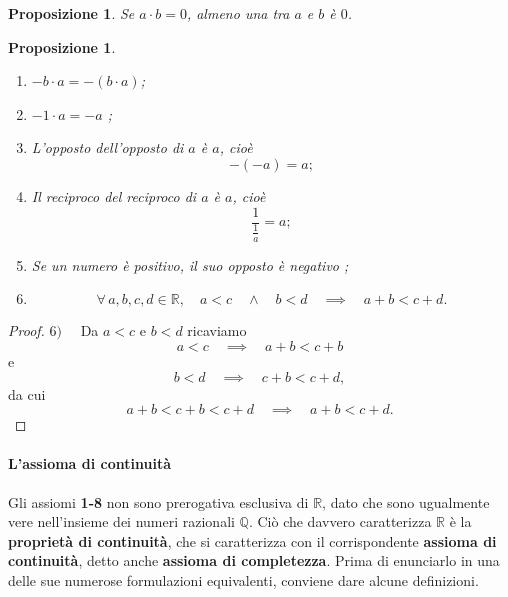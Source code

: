 \documentclass{article}
\theoremstyle{plain}
\newtheorem{prop}[thm]{Proposizione}
\theoremstyle{definition}
\theoremstyle{remark}
\begin{document}
\vspace{10pt}

\begin{bxthm}
\begin{prop}
    Se $a\cdot b=0$, almeno una tra $a$ e $b$ è $0$.
\end{prop}
\end{bxthm}

\vspace{10pt}

\begin{bxthm}
\begin{prop}\label{disug}\hfill
    \begin{enumerate}
        \item $-b\cdot a=-(b\cdot a)$;
        \item $-1\cdot a=-a$ ;
        \item L'opposto dell'opposto di $a$ è $a$, cioè \[-(-a)=a;\]
        \item Il reciproco del reciproco di $a$ è $a$, cioè \[\dfrac{1}{\frac{1}{a}}=a;\]
        \item Se un numero è positivo, il suo opposto è negativo ;
        \item \[\forall\,a,b,c,d\in\mathbb{R},\quad a<c\quad\land\quad b<d\quad\implies\quad a+b<c+d.\]
    \end{enumerate}
\end{prop}
\end{bxthm}
\begin{proof}
    $6)\quad$ Da $a<c$ e $b<d$ ricaviamo
    \[a<c\quad\implies\quad a+b<c+b \]
    e
    \[b<d\quad\implies\quad c+b<c+d,\]
    da cui \[a+b<c+b<c+d\quad\implies\quad a+b<c+d.\]
\end{proof}

\vspace{10pt}
\paragraph{L'assioma di continuità}
\vspace{10pt}

Gli assiomi \textbf{1-8} non sono prerogativa esclusiva di $\mathbb{R}$, dato che sono ugualmente vere nell'insieme dei numeri razionali $\mathbb{Q}$. Ciò che davvero caratterizza $\mathbb{R}$ è la \textbf{proprietà di continuità}, che si caratterizza con il corrispondente \textbf{assioma di continuità}, detto anche \textbf{assioma di completezza}. 
Prima di enunciarlo in una delle sue numerose formulazioni equivalenti, conviene dare alcune deﬁnizioni.
\end{document}
